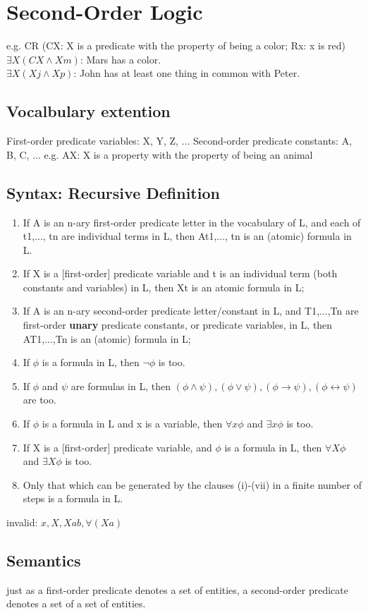\section{Second-Order Logic}
e.g. CR (CX: X is a predicate with the property of being a color; Rx: x is red) \\
$\exists X(CX \land Xm)$: Mars has a color. \\
$\exists X(Xj \land Xp)$: John has at least one thing in common with Peter.

\subsection*{Vocalbulary extention}
First-order predicate variables: X, Y, Z, ...
Second-order predicate constants: A, B, C, ...
e.g. AX: X is a property with the property of being an animal

\subsection*{Syntax: Recursive Definition}
\begin{enumerate}
\item If A is an n-ary first-order predicate letter in the vocabulary of L, and each of t1,..., tn are individual terms in L, then At1,..., tn is an (atomic) formula in L.
\item If X is a [first-order] predicate variable and t is an individual term (both constants and variables) in L, then Xt is an atomic formula in L;
\item If A is an n-ary second-order predicate letter/constant in L, and
T1,...,Tn are first-order \textbf{unary} predicate constants, or predicate
variables, in L, then AT1,...,Tn is an (atomic) formula in L;
\item If $\phi$ is a formula in L, then $\neg \phi$ is too.
\item If $\phi$ and $\psi$ are formulas in L, then $(\phi \land \psi), (\phi \lor \psi), (\phi \to \psi), (\phi \leftrightarrow \psi)$ are too.
\item If $\phi$ is a formula in L and x is a variable, then $\forall x \phi$ and $\exists x \phi$ is too.
\item If X is a [first-order] predicate variable, and $\phi$ is a formula in L, then $\forall X \phi$ and $\exists X \phi$ is too.
\item Only that which can be generated by the clauses (i)-(vii) in a finite number of steps is a formula in L.
\end{enumerate}
invalid: $x, X, Xab, \forall(Xa)$ \\

\subsection*{Semantics}
just as a first-order predicate denotes a set of entities, a second-order predicate denotes a set of a
set of entities.